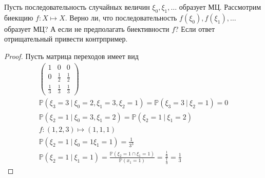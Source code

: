     \begin{prob}
        Пусть последовательность случайных величин $\xi_{0}, \xi_{1}, \ldots$ образует МЦ. Рассмотрим биекщию $f: X \mapsto X$. Верно ли, что последовательность $f\left(\xi_{0}\right), f\left(\xi_{1}\right), \ldots$ образует МЦ? А если не предполагать биективности $f$? Если ответ отрищательный привести контрпример.
    \end{prob}
    \begin{proof}
        Пусть матрица переходов имеет вид
        \begin{gather*}
        \begin{pmatrix}
            1 & 0 & 0\\
            0 & \frac{1}{2} & \frac{1}{2}\\
            \frac{1}{3} & \frac{1}{3} & \frac{1}{3}
        \end{pmatrix}\\
        \mathbb{P}(\xi_3 = 3\ |\ \xi_0 = 2, \xi_1 = 3, \xi_2 = 1)
        = \mathbb{P}(\xi_3 = 3\ |\ \xi_2 = 1)
        = 0\\
        \mathbb{P}(\xi_2 = 1\ |\ \xi_0 = 3, \xi_1 = 2)
        = \mathbb{P}(\xi_2 = 1\ |\ \xi_1 = 2)\\
        f: (1, 2, 3) \mapsto (1, 1, 1)\\
        \mathbb{P}(\xi_2 = 1\ |\ \xi_0 = 1 \xi_1 = 1) = \frac{1}{3^3}\\
        \mathbb{P}(\xi_2 = 1\ |\ \xi_1 = 1)
        = \frac{\mathbb{P}(\xi_2 = 1 \cap \xi_1 = 1)}{\mathbb{P}(x_1 = 1)}
        = \frac{\frac{1}{9}}{\frac{1}{3}}
        = \frac{1}{3}
        \end{gather*}
    \end{proof}
\vskip 0.6in


